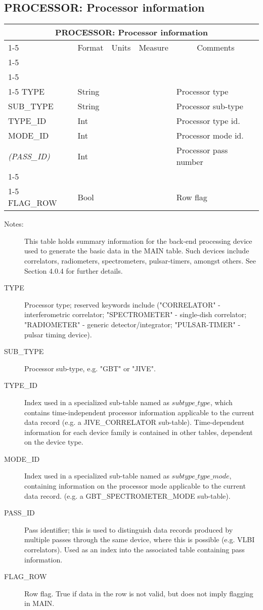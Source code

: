 \documentclass{article}
\newcommand{\defline}[1]{\cline{1-5}
\multicolumn{5}{|l|}{#1} \\
\cline{1-5}}
\newcommand{\definetable}[2]
{
	\vfill\newpage
	\subsection{#1}
        \vspace{0.15in}
        \small
	\begin{tabular}{|l|p{1.25in}|l|p{.9in}|p{1.4in}|}
	\hline
	\multicolumn{5}{|c|}{\bf #1}\\ 
	\cline{1-5}
        \multicolumn{1}{|c|}{Name}&\multicolumn{1}{|c|}{Format}&
        \multicolumn{1}{|c|}{Units}&\multicolumn{1}{|c|}{Measure}&
        \multicolumn{1}{|c|}{Comments}\\
        \cline{1-5}
        #2
        \hline
	\end{tabular}
}
\begin{document}
\begin{itemize}
\definetable{PROCESSOR: Processor information}{
\defline{\bf Columns}
\defline{\em Data}
TYPE            & String & & & Processor type \\
SUB\_TYPE & String & & & Processor sub-type\\
TYPE\_ID  & Int & & & Processor type id.\\
MODE\_ID  & Int & & & Processor mode id.\\
{\it (PASS\_ID)}  & Int & & & Processor pass number\\
\defline{\em Flags}
FLAG\_ROW & Bool & & & Row flag\\
}
\begin{description}

\item[Notes:] This table holds summary information for the back-end
processing device used to generate the basic data in the MAIN
table. Such devices include correlators, radiometers, spectrometers,
pulsar-timers, amongst others. See Section 4.0.4 for further details.

\item[TYPE] Processor type; reserved keywords include ("CORRELATOR" -
interferometric correlator; "SPECTROMETER" - single-dish correlator;
"RADIOMETER" - generic detector/integrator; "PULSAR-TIMER" - pulsar
timing device).

\item[SUB\_TYPE] Processor sub-type, e.g. "GBT" or "JIVE".

\item[TYPE\_ID] Index used in a specialized sub-table named as
$subtype\_type$, which contains time-independent processor information
applicable to the current data record (e.g. a JIVE\_CORRELATOR
sub-table).  Time-dependent information for each device family is
contained in other tables, dependent on the device type.

\item[MODE\_ID] Index used in a specialized sub-table named as
$subtype\_type\_mode$, containing information on the processor mode
applicable to the current data record. (e.g. a GBT\_SPECTROMETER\_MODE
sub-table).

\item[PASS\_ID] Pass identifier; this is used to distinguish data records
produced by multiple passes through the same device, where this is
possible (e.g. VLBI correlators). Used as an index into the associated
table containing pass information.

\item[FLAG\_ROW] Row flag. True if data in the row is not valid, but
does not imply flagging in MAIN.


\end{description}
\end{itemize}
\end{document}
